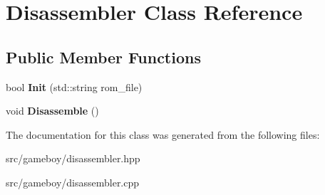 \hypertarget{classDisassembler}{}\section{Disassembler Class Reference}
\label{classDisassembler}
\subsection*{Public Member Functions}
\begin{DoxyCompactItemize}
\item 
\mbox{\label{classDisassembler_a569452759a1a0ae0ca52c0bb0d451c46}} 
bool {\bfseries Init} (std\+::string rom\+\_\+file)
\item 
\mbox{\label{classDisassembler_a7dbc8f55be4a05749bf94a93d3e44d85}} 
void {\bfseries Disassemble} ()
\end{DoxyCompactItemize}


The documentation for this class was generated from the following files\+:\begin{DoxyCompactItemize}
\item 
src/gameboy/disassembler.\+hpp\item 
src/gameboy/disassembler.\+cpp\end{DoxyCompactItemize}
